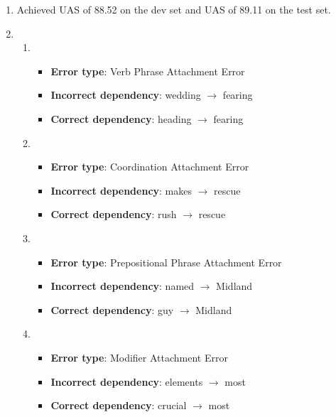 \documentclass{article}
\begin{document}
\begin{enumerate}[label=(\alph*),start=5]
\item Achieved UAS of 88.52 on the dev set and UAS of 89.11 on the test set.
\item
\begin{enumerate}[label=\roman*.]
\item
\begin{itemize}
\item \textbf{Error type}: Verb Phrase Attachment Error
\item \textbf{Incorrect dependency}: wedding $\rightarrow$ fearing
\item \textbf{Correct dependency}: heading $\rightarrow$ fearing
\end{itemize}
\item
\begin{itemize}
\item \textbf{Error type}: Coordination Attachment Error
\item \textbf{Incorrect dependency}: makes $\rightarrow$ rescue
\item \textbf{Correct dependency}: rush $\rightarrow$ rescue
\end{itemize}
\item 
\begin{itemize}
\item \textbf{Error type}: Prepositional Phrase Attachment Error
\item \textbf{Incorrect dependency}: named $\rightarrow$ Midland
\item \textbf{Correct dependency}: guy $\rightarrow$ Midland
\end{itemize}
\item 
\begin{itemize}
\item \textbf{Error type}: Modifier Attachment Error
\item \textbf{Incorrect dependency}: elements $\rightarrow$ most
\item \textbf{Correct dependency}: crucial $\rightarrow$ most
\end{itemize}
\end{enumerate}
\end{enumerate}
\end{document}
